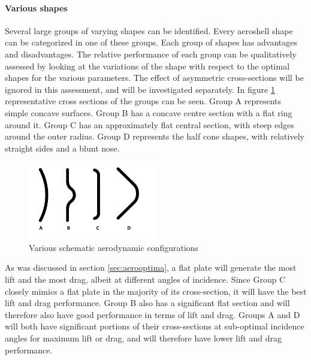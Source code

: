 \paragraph{Various shapes} \label{sec:aeroshapes}
Several large groups of varying shapes can be identified. Every aeroshell shape can be categorized in one of these groups.  Each group of shapes has advantages and disadvantages. The relative performance of each group can be qualitatively assessed by looking at the variations of the shape with respect to the optimal shapes for the various parameters. The effect of asymmetric cross-sections will be ignored in this assessment, and will be investigated separately. In figure \ref{fig:aeroshapes} representative cross sections of the groups can be seen. Group A represents simple concave surfaces. Group B has a concave centre section with a flat ring around it. Group C has an approximately flat central section, with steep edges around the outer radius. Group D represents the half cone shapes, with relatively straight sides and a blunt nose. 

\begin{figure} 
	\centering
	\includegraphics[width=0.5\textwidth]{./Figure/Aerodynamics/AeroShapes.pdf}
	\caption{Various schematic aerodynamic configurations}
	\label{fig:aeroshapes}
\end{figure}

As was discussed in section \ref{sec:aerooptima}, a flat plate will generate the most lift and the most drag, albeit at different angles of incidence. Since Group C closely mimics a flat plate in the majority of its cross-section, it will have the best lift and drag performance. Group B also has a significant flat section and will therefore also have good performance in terms of lift and drag. Groups A and D will both have significant portions of their cross-sections at sub-optimal incidence angles for maximum lift or drag, and will therefore have lower lift and drag performance.

